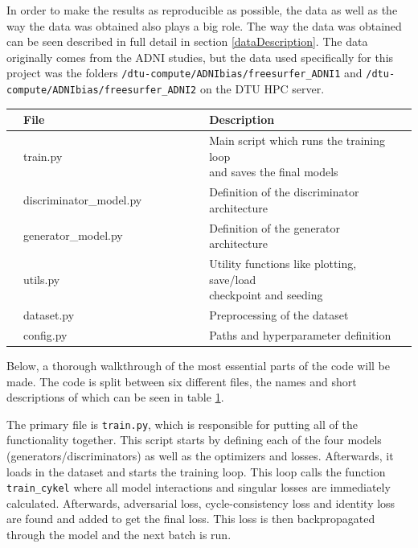 \documentclass[12pt, fleqn, titlepage]{article}
\begin{document}
In order to make the results as reproducible as possible, the data as well as the way the data was obtained also plays a big role. The way the data was obtained can be seen described in full detail in section \ref{dataDescription}. The data originally comes from the ADNI studies, but the data used specifically for this project was the folders \texttt{/dtu-compute/ADNIbias/freesurfer\_ADNI1} and \texttt{/dtu-compute/ADNIbias/freesurfer\_ADNI2} on the DTU HPC server.\\

\begin{table}[H]\label{fig:files}
	\begin{center}
		\begin{tabular}{l l l l l l l l l}
			\toprule
			& \textbf{File}          & & & & & & \textbf{Description}  & \\ \midrule
			& train.py               & & & & & & \makecell[tl]{Main script which runs the training loop \\ and saves the final models} & \\
			& discriminator\_model.py& & & & & & Definition of the discriminator architecture & \\
			& generator\_model.py    & & & & & & Definition of the generator architecture & \\
			& utils.py               & & & & & & \makecell[tl]{Utility functions like plotting, save/load \\ checkpoint and seeding} & \\
			& dataset.py             & & & & & & Preprocessing of the dataset & \\
			& config.py              & & & & & & Paths and hyperparameter definition & \\ \bottomrule
		\end{tabular}
	\end{center}
\end{table}

\noindent Below, a thorough walkthrough of the most essential parts of the code will be made. The code is split between six different files, the names and short descriptions of which can be seen in table \ref{fig:files}. 

The primary file is \texttt{train.py}, which is responsible for putting all of the functionality together. This script starts by defining each of the four models (generators/discriminators) as well as the optimizers and losses. Afterwards, it loads in the dataset and starts the training loop. This loop calls the function \texttt{train\_cykel} where all model interactions and singular losses are immediately calculated. Afterwards, adversarial loss, cycle-consistency loss and identity loss are found and added to get the final loss. This loss is then backpropagated through the model and the next batch is run.
\end{document}
